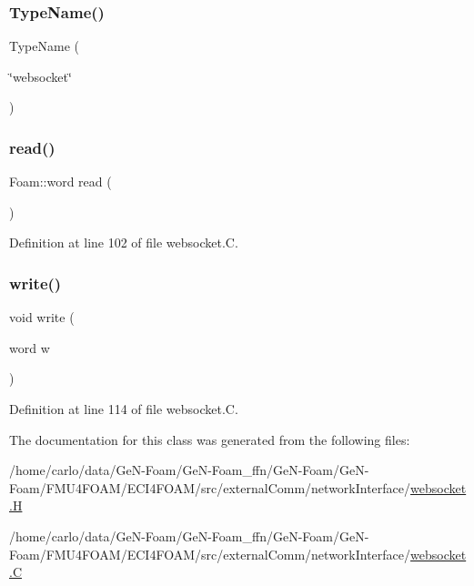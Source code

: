 \subsubsection{\texorpdfstring{Type\+Name()}{TypeName()}}
{\footnotesize\ttfamily Type\+Name (\begin{DoxyParamCaption}\item[{\char`\"{}websocket\char`\"{}}]{ }\end{DoxyParamCaption})}

\mbox{\label{classFoam_1_1websocket_aaef38f7ec08b1ae0135900e9ae1fb1f8}} 
\subsubsection{\texorpdfstring{read()}{read()}}
{\footnotesize\ttfamily Foam\+::word read (\begin{DoxyParamCaption}{ }\end{DoxyParamCaption})}



Definition at line 102 of file websocket.\+C.

\mbox{\label{classFoam_1_1websocket_a5abf104fabb38aa7c80721483091cf0b}} 
\subsubsection{\texorpdfstring{write()}{write()}}
{\footnotesize\ttfamily void write (\begin{DoxyParamCaption}\item[{word}]{w }\end{DoxyParamCaption})}



Definition at line 114 of file websocket.\+C.



The documentation for this class was generated from the following files\+:\begin{DoxyCompactItemize}
\item 
/home/carlo/data/\+Ge\+N-\/\+Foam/\+Ge\+N-\/\+Foam\+\_\+ffn/\+Ge\+N-\/\+Foam/\+Ge\+N-\/\+Foam/\+F\+M\+U4\+F\+O\+A\+M/\+E\+C\+I4\+F\+O\+A\+M/src/external\+Comm/network\+Interface/\hyperlink{websocket_8H}{websocket.\+H}\item 
/home/carlo/data/\+Ge\+N-\/\+Foam/\+Ge\+N-\/\+Foam\+\_\+ffn/\+Ge\+N-\/\+Foam/\+Ge\+N-\/\+Foam/\+F\+M\+U4\+F\+O\+A\+M/\+E\+C\+I4\+F\+O\+A\+M/src/external\+Comm/network\+Interface/\hyperlink{websocket_8C}{websocket.\+C}\end{DoxyCompactItemize}
